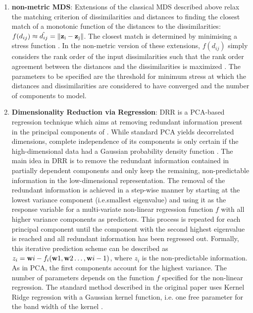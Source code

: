 \begin{enumerate}
\item\textbf{non-metric MDS}: Extensions of the classical MDS described above relax the matching criterion of dissimilarities and distances to finding the closest match of a monotonic function of the distances to the dissimilarities: \(f(d_{ij}) \approx \hat{d_{ij}} = \lVert \boldsymbol{\mathbf{z}}_\text{i} - \boldsymbol{\mathbf{z}}_\text{j}\rVert \). The closest match is determined by minimising a stress function \citep{Kruskal1964a,Kruskal1964b}. In the non-metric version of these extensions, \(f(d_{ij})\) simply considers the rank order of the input dissimilarities such that the rank order agreement between the distances and the dissimilarities is maximized \citep{Minchin1987}. The parameters to be specified are the threshold for minimum stress at which the distances and dissimilarities are considered to have converged and the number of components to model.

\item\textbf{Dimensionality Reduction via Regression}: DRR is a PCA-based regression technique which aims at removing redundant information present in the principal components  of . While standard PCA yields decorrelated dimensions, complete independence of its components is only certain if the high-dimensional data had a Gaussian probability density function \citep{Laparra2015}. The main idea in DRR is to remove the redundant information contained in partially dependent components and only keep the remaining, non-predictable information in the low-dimensional representation. The removal of the redundant information is achieved in a step-wise manner by starting at the lowest variance component (i.e.smallest eigenvalue) and using it as the response variable for a multi-variate non-linear regression function \(f\) with all higher variance components as predictors. This process is repeated for each principal component until the component with the second highest eigenvalue is reached and all redundant information has been regressed out.  Formally, this iterative prediction scheme can be described as\(z_i = \boldsymbol{\mathbf{w}}{i} - f_i(\boldsymbol{\mathbf{w}}{1},\boldsymbol{\mathbf{w}}{2} \dots , \boldsymbol{\mathbf{w}}{i-1})\), where \(z_i\) is the non-predictable information. As in PCA, the first components account for the highest variance. The number of parameters depends on the function \(f\) specified for the non-linear regression. The standard method described in the original paper uses Kernel Ridge regression with a Gaussian kernel function, i.e. one free parameter for the band width of the kernel \citep{Laparra2015}. 


\end{enumerate}
